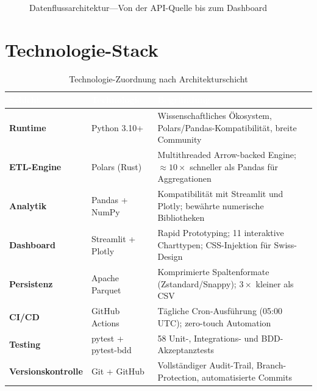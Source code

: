 \documentclass[11pt, a4paper, oneside, openany]{report}
\begin{document}
\begin{figure}[H]
{%
}%
\caption{Datenflussarchitektur\;---\;Von der API-Quelle bis zum Dashboard}
\label{fig:architektur}
\end{figure}

\section{Technologie-Stack}

\begin{table}[H]
\centering
\caption{Technologie-Zuordnung nach Architekturschicht}
\label{tab:techstack}
\sffamily\small
\begin{tabularx}{\textwidth}{>{\bfseries}p{2.5cm} p{3.5cm} X}
  \toprule
  \rowcolor{DeepNavy} \textcolor{white}{\textbf{Schicht}} & \textcolor{white}{\textbf{Technologie}} & \textcolor{white}{\textbf{Begründung}} \\
  \midrule
  Runtime          & Python 3.10+         & Wissenschaftliches Ökosystem, Polars/Pandas-Kompatibilität, breite Community \\
  ETL-Engine       & Polars (Rust)        & Multithreaded Arrow-backed Engine; $\approx 10\times$ schneller als Pandas für Aggregationen \\
  Analytik         & Pandas + NumPy       & Kompatibilität mit Streamlit und Plotly; bewährte numerische Bibliotheken \\
  Dashboard        & Streamlit + Plotly   & Rapid Prototyping; 11 interaktive Charttypen; CSS-Injektion für Swiss-Design \\
  Persistenz       & Apache Parquet       & Komprimierte Spaltenformate (Zstandard/Snappy); $3\times$ kleiner als CSV \\
  CI/CD            & GitHub Actions       & Tägliche Cron-Ausführung (05:00\,UTC); zero-touch Automation \\
  Testing          & pytest + pytest-bdd  & 58 Unit-, Integrations- und BDD-Akzeptanztests \\
  Versionskontrolle & Git + GitHub        & Vollständiger Audit-Trail, Branch-Protection, automatisierte Commits \\
  \bottomrule
\end{tabularx}
\end{table}
\end{document}
